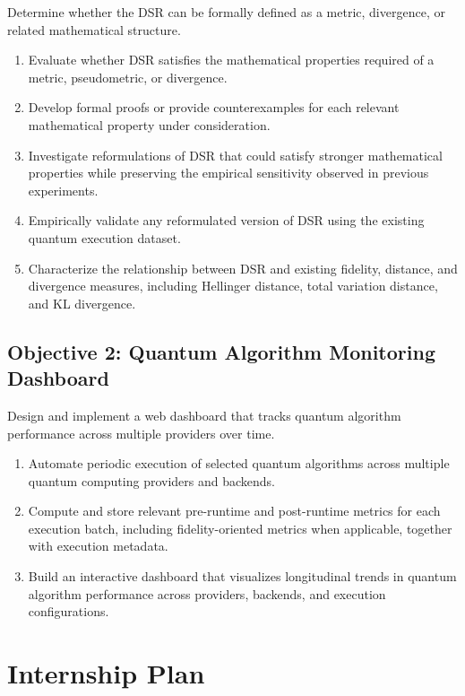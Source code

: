 \documentclass[11pt]{article}
\begin{document}
Determine whether the DSR can be formally defined as a metric, divergence, or related mathematical structure.

\begin{enumerate}[label=O1.\arabic*]
  \item Evaluate whether DSR satisfies the mathematical properties required of a metric, pseudometric, or divergence.
  \item Develop formal proofs or provide counterexamples for each relevant mathematical property under consideration.
  \item Investigate reformulations of DSR that could satisfy stronger mathematical properties while preserving the empirical sensitivity observed in previous experiments.
  \item Empirically validate any reformulated version of DSR using the existing quantum execution dataset.
  \item Characterize the relationship between DSR and existing fidelity, distance, and divergence measures, including Hellinger distance, total variation distance, and KL divergence.
\end{enumerate}

\subsection{Objective 2: Quantum Algorithm Monitoring Dashboard}

Design and implement a web dashboard that tracks quantum algorithm performance across multiple providers over time.

\begin{enumerate}[label=O2.\arabic*]
  \item Automate periodic execution of selected quantum algorithms across multiple quantum computing providers and backends.
  \item Compute and store relevant pre-runtime and post-runtime metrics for each execution batch, including fidelity-oriented metrics when applicable, together with execution metadata.
  \item Build an interactive dashboard that visualizes longitudinal trends in quantum algorithm performance across providers, backends, and execution configurations.
\end{enumerate}

\section{Internship Plan}
\end{document}
